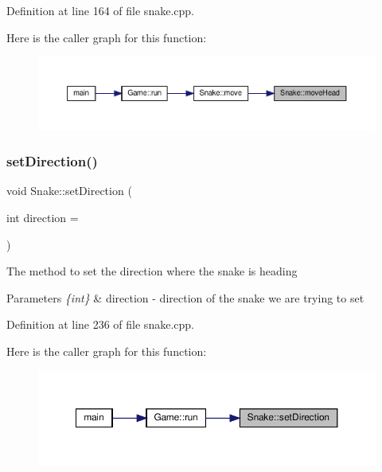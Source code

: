 Definition at line 164 of file snake.\+cpp.

Here is the caller graph for this function\+:
\nopagebreak
\begin{figure}[H]
\begin{center}
\leavevmode
\includegraphics[width=350pt]{class_snake_a59b2f5b18ab563d1583dfb15064784a0_icgraph}
\end{center}
\end{figure}
\mbox{\label{class_snake_a151d9cab8233d38524c09642d079356a}} 
\subsubsection{\texorpdfstring{setDirection()}{setDirection()}}
{\footnotesize\ttfamily void Snake\+::set\+Direction (\begin{DoxyParamCaption}\item[{int}]{direction = {} }\end{DoxyParamCaption})}

The method to set the direction where the snake is heading 
\begin{DoxyParams}{Parameters}
{\em \{int\}} & direction -\/ direction of the snake we are trying to set \\
\hline
\end{DoxyParams}


Definition at line 236 of file snake.\+cpp.

Here is the caller graph for this function\+:
\nopagebreak
\begin{figure}[H]
\begin{center}
\leavevmode
\includegraphics[width=350pt]{class_snake_a151d9cab8233d38524c09642d079356a_icgraph}
\end{center}
\end{figure}
\mbox{\label{class_snake_a0c305e807c15736f809eb035d947c988}} 
